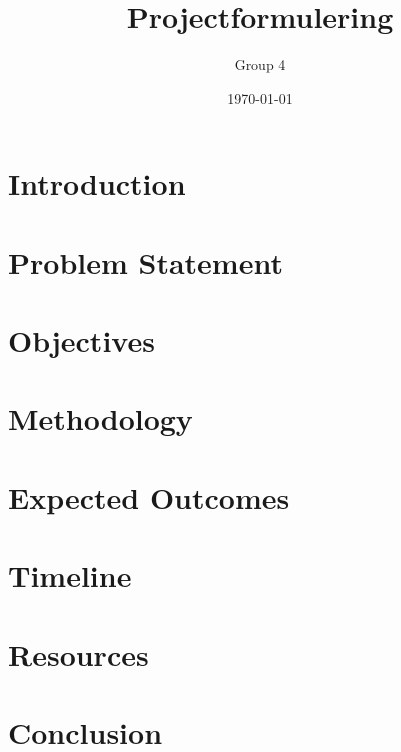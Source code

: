 \documentclass{article}
\title{Projectformulering}
\author{Group 4}
\date{\today}
\begin{document}
\maketitle

\section{Introduction}

\section{Problem Statement}

\section{Objectives}

\section{Methodology}

\section{Expected Outcomes}

\section{Timeline}

\section{Resources}

\section{Conclusion}
\end{document}

